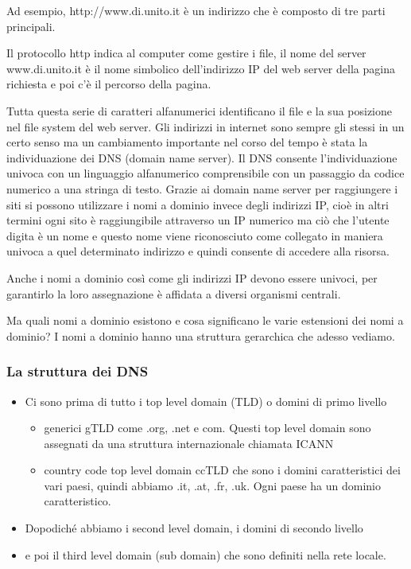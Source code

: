 Ad esempio, http://www.di.unito.it è un indirizzo che è composto di tre parti principali.

Il protocollo http indica al computer come gestire i file, il nome del server www.di.unito.it è il nome simbolico dell'indirizzo IP del web server della pagina richiesta e poi c'è il percorso della pagina.

Tutta questa serie di caratteri alfanumerici identificano il file e la sua posizione nel file system del web server. 
Gli indirizzi in internet sono sempre gli stessi in un certo senso ma un cambiamento importante nel corso del tempo è stata la individuazione dei DNS (domain name server). 
Il DNS consente l'individuazione univoca con un linguaggio alfanumerico comprensibile con un passaggio da codice numerico a una stringa di testo. Grazie ai domain name server per raggiungere i siti si possono utilizzare i nomi a dominio invece degli indirizzi IP, cioè in altri termini ogni sito è raggiungibile attraverso un IP numerico ma ciò che l'utente digita è un nome e questo nome viene riconosciuto come collegato in maniera univoca a quel determinato indirizzo e quindi consente di accedere alla risorsa.

Anche i nomi a dominio così come gli indirizzi IP devono essere univoci, per garantirlo la loro assegnazione è affidata a diversi organismi centrali.

Ma quali nomi a dominio esistono e cosa significano le varie estensioni dei nomi a dominio? I nomi a dominio hanno una struttura gerarchica che adesso vediamo.

\subsubsection{La struttura dei DNS}

\begin{itemize}
    \item Ci sono prima di tutto i top level domain (TLD) o domini di primo livello
          \begin{itemize}
              \item generici gTLD come .org, .net e com. Questi top level domain sono assegnati da una struttura internazionale chiamata ICANN
              \item country code top level domain ccTLD che sono i domini caratteristici dei vari paesi, quindi abbiamo .it, .at, .fr, .uk. Ogni paese ha un dominio caratteristico.
          \end{itemize}
    \item Dopodiché abbiamo i second level domain, i domini di secondo livello
    \item e poi il third level domain (sub domain) che sono definiti nella rete locale.
\end{itemize}

